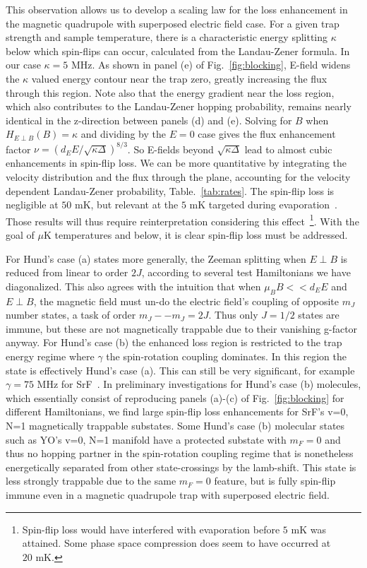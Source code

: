 \documentclass[%
 reprint,
groupedaddress,
 amsmath,amssymb,
 aps,
prl,
]{revtex4-1}
\newcommand{\epb}{{$E\!\perp\!B$}}
\newcommand{\epbm}{{E\!\perp\!B}}
\begin{document}
This observation allows us to develop a scaling law for the loss enhancement in the magnetic quadrupole with superposed electric field case. For a given trap strength and sample temperature, there is a characteristic energy splitting $\kappa$ below which spin-flips can occur, calculated from the Landau-Zener formula. In our case $\kappa=5\text{ MHz}$. As shown in panel (e) of Fig.~\ref{fig:blocking}, E-field widens the $\kappa$ valued energy contour near the trap zero, greatly increasing the flux through this region. Note also that the energy gradient near the loss region, which also contributes to the Landau-Zener hopping probability, remains nearly identical in the z-direction between panels (d) and (e). Solving for $B$ when $H_\epbm(B)=\kappa$ and dividing by the $E=0$ case gives the flux enhancement factor $\nu = (d_EE/\sqrt{\kappa\Delta})^{8/3}$. So E-fields beyond $\sqrt{\kappa\Delta}$ lead to almost cubic enhancements in spin-flip loss. We can be more quantitative by integrating the velocity distribution and the flux through the plane, accounting for the velocity dependent Landau-Zener probability, Table.~\ref{tab:rates}. The spin-flip loss is negligible at $50\text{ mK}$, but relevant at the $5\text{ mK}$ targeted during evaporation~\cite{Stuhl2012evap}. Those results will thus require reinterpretation considering this effect~\footnote{Spin-flip loss would have interfered with evaporation before $5\text{ mK}$ was attained. Some phase space compression does seem to have occurred at $20\text{ mK}$.}. With the goal of $\mu\text{K}$ temperatures and below, it is clear spin-flip loss must be addressed. 

For Hund's case (a) states more generally, the Zeeman splitting when \epb{}  is reduced from linear to order $2J$, according to several test Hamiltonians we have diagonalized. This also agrees with the intuition that when $\mu_BB<<d_EE$ and \epb, the magnetic field must un-do the electric field's coupling of opposite $m_J$ number states, a task of order $m_J--m_J=2J$. Thus only $J=1/2$ states are immune, but these are not magnetically trappable due to their vanishing g-factor anyway. For Hund's case (b) the enhanced loss region is restricted to the trap energy regime where $\gamma$ the spin-rotation coupling dominates. In this region the state is effectively Hund's case (a). This can still be very significant, for example $\gamma=75\text{ MHz}$ for SrF~\cite{Quemener2016}. In preliminary investigations for Hund's case (b) molecules, which essentially consist of reproducing panels (a)-(c) of Fig.~\ref{fig:blocking} for different Hamiltonians, we find large spin-flip loss enhancements for SrF's v=0, N=1 magnetically trappable substates. Some Hund's case (b) molecular states such as YO's v=0, N=1 manifold have a protected substate with $m_F=0$ and thus no hopping partner in the spin-rotation coupling regime that is nonetheless energetically separated from other state-crossings by the lamb-shift. This state is less strongly trappable due to the same $m_F=0$ feature, but is fully spin-flip immune even in a magnetic quadrupole trap with superposed electric field.
\end{document}
